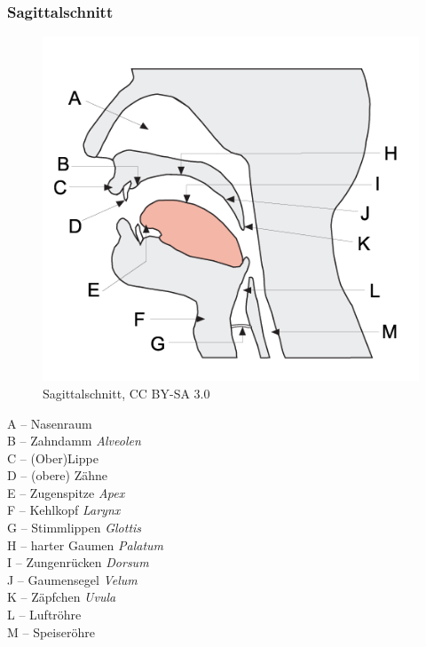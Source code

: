 \begin{frame}
\frametitle{Sagittalschnitt}

\begin{minipage}{0.48\textwidth}
	\begin{figure}
	\centering
	\includegraphics[scale=0.32]{material/04phonoatonomy}
	\caption{Sagittalschnitt, CC BY-SA 3.0}
	\end{figure}
\end{minipage}\hfill
\begin{minipage}{0.4\textwidth}
	A -- Nasenraum\\
	B -- Zahndamm \emph{Alveolen}\\
	C -- (Ober)Lippe \\
	D -- (obere) Zähne\\
	E -- Zugenspitze \emph{Apex}\\
	F -- Kehlkopf \emph{Larynx}\\
	G -- Stimmlippen \emph{Glottis}\\
	H -- harter Gaumen \emph{Palatum}\\
	I -- Zungenrücken \emph{Dorsum}\\
	J -- Gaumensegel \emph{Velum}\\
	K -- Zäpfchen \emph{Uvula}\\
	L -- Luftröhre\\ 
	M -- Speiseröhre
\end{minipage}
	
%		
	
\end{frame}



